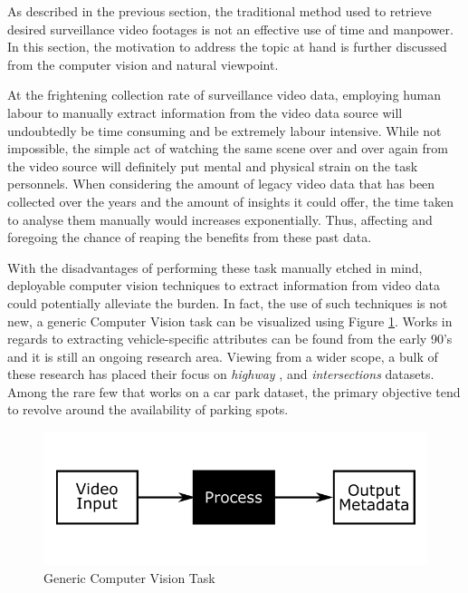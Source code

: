 As described in the previous section, the traditional method used to retrieve desired surveillance video footages is not an effective use of time and manpower. In this section, the motivation to address the topic at hand is further discussed from the computer vision and natural viewpoint.


At the frightening collection rate of surveillance video data, employing human labour to manually extract information from the video data source will undoubtedly be time consuming and be extremely labour intensive.
While not impossible, the simple act of watching the same scene over and over again from the video source will definitely put mental and physical strain on the task personnels. When considering the amount of legacy video data that has been collected over the years and the amount of insights it could offer, the time taken to analyse them manually would increases exponentially. Thus, affecting and foregoing the chance of reaping the benefits from these past data.

With the disadvantages of performing these task manually etched in mind, deployable computer vision techniques to extract information from video data could potentially alleviate the burden. In fact, the use of such techniques is not new, a generic Computer Vision task can be visualized using Figure \ref{fig:genericCV}. Works in regards to extracting vehicle-specific attributes can be found from the early 90's and it is still an ongoing research area. Viewing from a wider scope, a bulk of these research has placed their focus on \textit{highway} \cite{yu2017improved, cao2016vehicle, arya2016real, liu2016highway, al2016adaptive}, and  \textit{intersections} \cite{meng2017traffic, choong2017modeling, ren2018learning} datasets. Among the rare few \cite{shi2017study, marmol2016quickspot, ling2017identifying} that works on a car park dataset, the primary objective tend to revolve around the availability of parking spots.

\begin{figure}[!hbt]\centering
\includegraphics[width=.8\textwidth]{image/general/simpleframe.png}
\caption{Generic Computer Vision Task}
\label{fig:genericCV}
\end{figure}

